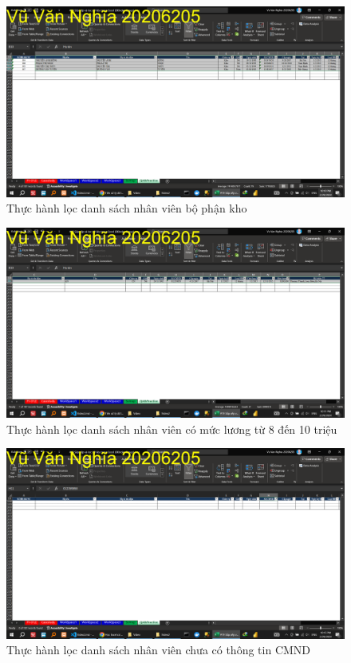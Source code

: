 \documentclass{article}
\begin{document}
\begin{figure}[h]
    \centering
    \includegraphics[scale = 0.15]{Video2/ThucHanh/3.png}
    \caption{Thực hành lọc danh sách nhân viên bộ phận kho}
\end{figure}



\begin{figure}[h]
    \centering
    \includegraphics[scale = 0.15]{Video2/ThucHanh/4.png}
    \caption{Thực hành lọc danh sách nhân viên có mức lương từ 8 đến 10 triệu}
\end{figure}


\begin{figure}[h]
    \centering
    \includegraphics[scale = 0.15]{Video2/ThucHanh/5.png}
    \caption{Thực hành lọc danh sách nhân viên chưa có thông tin CMND}
\end{figure}
\end{document}
